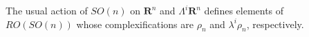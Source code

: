 The usual action of $SO(n)$ on $\mathbf{R}^n$ and $\Lambda^i \mathbf{R}^n$ defines elements of $RO(SO(n))$ whose complexifications are $\rho_n$ and $\lambda^i \rho_n$, respectively.
